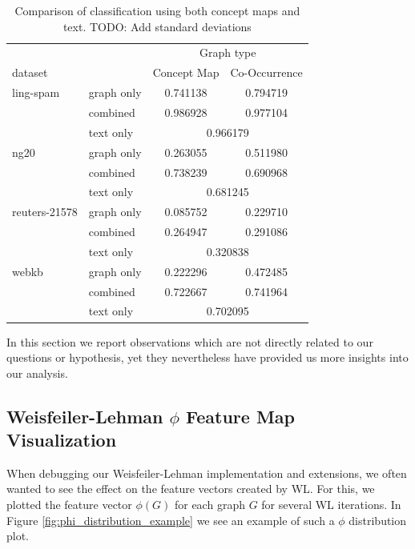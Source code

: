 

\begin{table}[htb!]
\centering
\begin{tabular}{llcc}
  &  & \multicolumn{2}{c}{Graph type} \\
   dataset   & &  Concept Map &  Co-Occurrence \\
\midrule
ling-spam 
          & graph only &  0.741138 &  0.794719\\
          & combined &  0.986928 &  0.977104\\
          & text only & \multicolumn{2}{c}{ 0.966179 }\\
\midrule
ng20 
          & graph only &  0.263055 &  0.511980\\
          & combined &  0.738239 &  0.690968\\
          & text only & \multicolumn{2}{c}{ 0.681245 }\\
\midrule
reuters-21578 
          & graph only &  0.085752 &  0.229710\\
          & combined &  0.264947 &  0.291086\\
          & text only & \multicolumn{2}{c}{ 0.320838 }\\
\midrule
webkb 
          & graph only &  0.222296 &  0.472485\\
          & combined &  0.722667 &  0.741964\\
          & text only & \multicolumn{2}{c}{ 0.702095 }\\	
\bottomrule
\end{tabular}
\caption[Results: Combined text- and graph features]{Comparison of classification using both concept maps and text. TODO: Add standard deviations}%
\label{table:results_comparison_combined}
\end{table}


In this section we report observations which are not directly related to our questions or hypothesis, yet they nevertheless have provided us more insights into our analysis.

\subsection{Weisfeiler-Lehman $\phi$ Feature Map Visualization}
When debugging our Weisfeiler-Lehman implementation and extensions, we often wanted to see the effect on the feature vectors created by WL.
For this, we plotted the feature vector $\phi(G)$ for each graph $G$ for several WL iterations.
In Figure \ref{fig:phi_distribution_example} we see an example of such a $\phi$ distribution plot.

